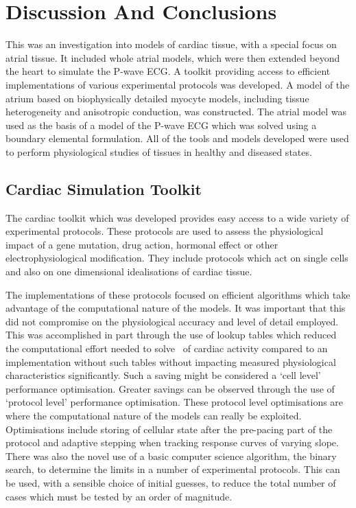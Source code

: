 \chapter{Discussion And Conclusions}


This was an investigation into models of cardiac tissue, with a special focus on
atrial tissue\cite{foo}.
It included whole atrial models, which were then extended beyond the heart to
simulate the P-wave ECG.
A toolkit providing access to efficient implementations of various experimental
protocols was developed.
A model of the atrium based on biophysically detailed myocyte models, including tissue heterogeneity and anisotropic
conduction, was constructed.
The atrial model was used as the basis of a model of the P-wave ECG which was
solved using a boundary elemental formulation.
All of the tools and models developed were used to perform physiological
studies of tissues in healthy and diseased states.

\section{Cardiac Simulation Toolkit}

The cardiac toolkit which was developed provides easy access to a wide variety
of experimental protocols.
These protocols are used to assess the physiological impact of a gene mutation,
drug action, hormonal effect or other electrophysiological modification.
They include protocols which act on single cells and also on one dimensional
idealisations of cardiac tissue.

The implementations of these protocols focused on efficient algorithms
which take advantage of the computational nature of the models.
It was important that this did not compromise on the physiological accuracy and
level of detail employed.
This was accomplished in part through the use of lookup tables which reduced the
computational effort needed to solve \ of cardiac activity compared to an
implementation without such tables without impacting measured physiological
characteristics significantly.
Such a saving might be considered a `cell level' performance optimisation.
Greater savings can be observed through the use of `protocol level' performance
optimisation.
These protocol level optimisations are where the computational nature of the
models can really be exploited.
Optimisations include storing of cellular state after the pre-pacing part of the
protocol and adaptive stepping when tracking response curves of varying slope.
There was also the novel use of a basic computer science algorithm, the binary
search, to determine the limits in a number of experimental protocols.
This can be used, with a sensible choice of initial guesses, to reduce the total
number of cases which must be tested by an order of magnitude.

